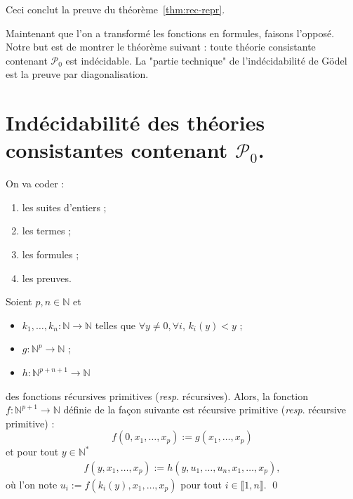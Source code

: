 \documentclass[./main]{subfiles}
\begin{document}
 Ceci conclut la preuve du théorème~\ref{thm:rec-repr}.

 Maintenant que l'on a transformé les fonctions en formules, faisons l'opposé.
 Notre but est de montrer le théorème suivant :
 toute théorie consistante contenant $\mathcal{P}_0$ est indécidable.
 La "partie technique" de l'indécidabilité de Gödel est la preuve par diagonalisation.

 \section{Indécidabilité des théories consistantes contenant $\mathcal{P}_0$.}

 On va coder :
 \begin{enumerate}
   \item les suites d'entiers ;
   \item les termes ;
   \item les formules ;
   \item les preuves.
 \end{enumerate}

 \begin{lem}[Récursion]
   Soient $p, n \in \mathds{N}$ et 
   \begin{itemize}
     \item $k_1, \ldots, k_n : \mathds{N} \to \mathds{N}$ telles que $\forall y \neq 0, \forall i$, $k_i(y) < y$ ;
     \item  $g : \mathds{N}^p \to \mathds{N}$ ;
     \item $h : \mathds{N}^{p + n+1} \to \mathds{N}$
   \end{itemize}
   des fonctions récursives primitives (\textit{resp}. récursives).
   Alors, la fonction $f : \mathds{N}^{p+1} \to \mathds{N}$ définie de la façon suivante est récursive primitive (\textit{resp}. récursive primitive) :
   \[f(0, x_1, \ldots, x_p) := g(x_1, \ldots, x_p)\]
   et pour tout $y \in \mathds{N}^*$
   \begin{align*}
     f(y, x_1, \ldots, x_p) := h(y, u_1, \ldots, u_n, x_1, \ldots, x_p)
   ,\end{align*}
   où l'on note $u_i := f(k_i(y), x_1, \ldots, x_p)$ pour tout  $i \in \llbracket 1, n\rrbracket$.
   \qed
 \end{lem}
\end{document}
